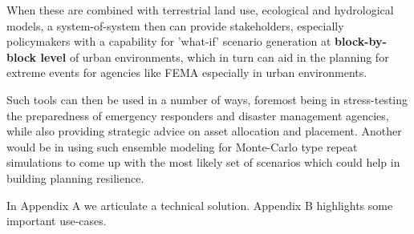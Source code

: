 When these are combined with terrestrial land use, ecological and
hydrological models, a system-of-system then can provide stakeholders,
especially policymakers with a capability for 'what-if' scenario
generation at \textbf{block-by-block level} of urban environments,
which in turn can aid in the planning for extreme events for agencies
like FEMA especially in urban environments. 

Such tools can then be used in a number of ways, foremost being in
stress-testing the preparedness of emergency responders and disaster
management agencies, while also providing strategic advice on asset
allocation and placement. Another would be in using such ensemble
modeling for Monte-Carlo type repeat simulations to come up with the
most likely set of scenarios which could help in building planning
resilience.

In Appendix A we articulate a technical solution. Appendix B
highlights some important use-cases.